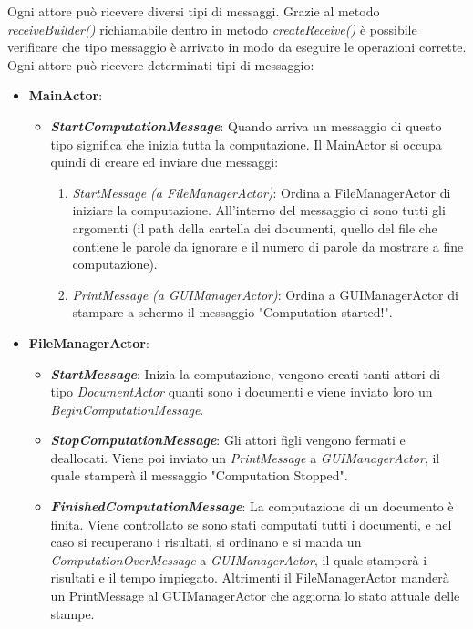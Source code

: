 Ogni attore può ricevere diversi tipi di messaggi. Grazie al metodo \textit{receiveBuilder()} richiamabile dentro in metodo \textit{createReceive()} è possibile verificare che tipo messaggio è arrivato in modo da eseguire le operazioni corrette.
Ogni attore può ricevere determinati tipi di messaggio:
\begin{itemize}
    \item \textbf{MainActor}:
        \begin{itemize}
            \item \textbf{\textit{StartComputationMessage}}: Quando arriva un messaggio di questo tipo significa che inizia tutta la computazione. Il MainActor si occupa quindi di creare ed inviare due messaggi:
            \begin{enumerate}
                \item \textit{StartMessage (a FileManagerActor)}: Ordina a FileManagerActor di iniziare la computazione. All'interno del messaggio ci sono tutti gli argomenti (il path della cartella dei documenti, quello del file che contiene le parole da ignorare e il numero di parole da mostrare a fine computazione).
                \item \textit{PrintMessage (a GUIManagerActor)}:
                Ordina a GUIManagerActor di stampare a schermo il messaggio "Computation started!".
            \end{enumerate}
        \end{itemize}
    \item \textbf{FileManagerActor}:
        \begin{itemize}
            \item \textbf{\textit{StartMessage}}: Inizia la computazione, vengono creati tanti attori di tipo \textit{DocumentActor} quanti sono i documenti e viene inviato loro un \textit{BeginComputationMessage}.
            \item \textbf{\textit{StopComputationMessage}}:
            Gli attori figli vengono fermati e deallocati. Viene poi inviato un \textit{PrintMessage} a \textit{GUIManagerActor}, il quale stamperà il messaggio "Computation Stopped".
            \item \textbf{\textit{FinishedComputationMessage}}:
            La computazione di un documento è finita. Viene controllato se sono stati computati tutti i documenti, e nel caso si recuperano i risultati, si ordinano e si manda un \textit{ComputationOverMessage} a \textit{GUIManagerActor}, il quale stamperà i risultati e il tempo impiegato. Altrimenti il FileManagerActor manderà un {PrintMessage} al GUIManagerActor che aggiorna lo stato attuale delle stampe.

\end{itemize}
\end{itemize}
